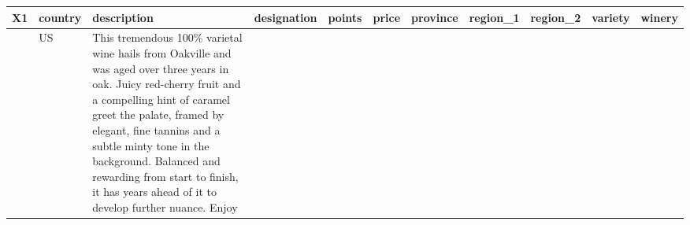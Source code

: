 \documentclass[]{tufte-handout}
\begin{document}
\begin{longtable}[]{@{}rlllrrlllll@{}}
\toprule
\begin{minipage}[b]{0.00\columnwidth}\raggedleft
X1\strut
\end{minipage} & \begin{minipage}[b]{0.01\columnwidth}\raggedright
country\strut
\end{minipage} & \begin{minipage}[b]{0.56\columnwidth}\raggedright
description\strut
\end{minipage} & \begin{minipage}[b]{0.03\columnwidth}\raggedright
designation\strut
\end{minipage} & \begin{minipage}[b]{0.01\columnwidth}\raggedleft
points\strut
\end{minipage} & \begin{minipage}[b]{0.01\columnwidth}\raggedleft
price\strut
\end{minipage} & \begin{minipage}[b]{0.02\columnwidth}\raggedright
province\strut
\end{minipage} & \begin{minipage}[b]{0.02\columnwidth}\raggedright
region\_1\strut
\end{minipage} & \begin{minipage}[b]{0.01\columnwidth}\raggedright
region\_2\strut
\end{minipage} & \begin{minipage}[b]{0.03\columnwidth}\raggedright
variety\strut
\end{minipage} & \begin{minipage}[b]{0.01\columnwidth}\raggedright
winery\strut
\end{minipage}\tabularnewline
\midrule
\endhead
\begin{minipage}[t]{0.00\columnwidth}\raggedleft
0\strut
\end{minipage} & \begin{minipage}[t]{0.01\columnwidth}\raggedright
US\strut
\end{minipage} & \begin{minipage}[t]{0.56\columnwidth}\raggedright
This tremendous 100\% varietal wine hails from Oakville and was aged
over three years in oak. Juicy red-cherry fruit and a compelling hint of
caramel greet the palate, framed by elegant, fine tannins and a subtle
minty tone in the background. Balanced and rewarding from start to
finish, it has years ahead of it to develop further nuance. Enjoy

\end{minipage}
\end{longtable}
\end{document}

